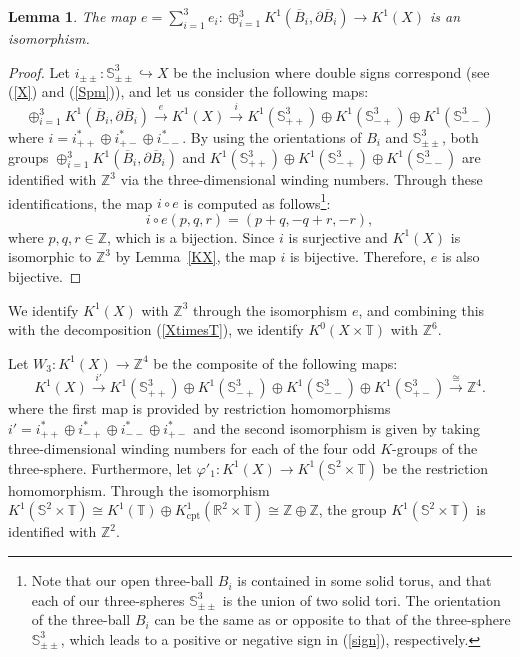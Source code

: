 \documentclass{amsart}
\theoremstyle{plain}
\newtheorem{lemma}[theorem]{Lemma}
\theoremstyle{definition}
\theoremstyle{remark}
\newcommand{\Z}{\mathbb{Z}}
\newcommand{\R}{\mathbb{R}}
\newcommand{\T}{\mathbb{T}}
\newcommand{\SSS}{\mathbb{S}}
\newcommand{\cpt}{\mathrm{cpt}}
\begin{document}
\begin{lemma}
\label{mape}
The map $e = \sum_{i=1}^3 e_i \colon \oplus_{i=1}^3 K^1(\overline{B}_i, \partial \overline{B}_i) \to K^1(X)$ is an isomorphism.
\end{lemma}

\begin{proof}
Let $i_{\pm \pm} \colon \SSS_{\pm\pm}^3 \hookrightarrow X$ be the inclusion where double signs correspond (see (\ref{X}) and (\ref{Spm})), and
let us consider the following maps:
\begin{equation}
\oplus_{i=1}^3 K^1(\overline{B}_i, \partial \overline{B}_i) \overset{e}{\to}
	K^1(X) \overset{i}{\to}
		K^1(\SSS^3_{++}) \oplus K^1(\SSS^3_{-+}) \oplus K^1(\SSS^3_{--})
\end{equation}
where $i = i_{++}^* \oplus i_{+-}^* \oplus i_{--}^*$.
By using the orientations of $B_i$ and $\SSS^3_{\pm \pm}$, both groups $\oplus_{i=1}^3 K^1(\overline{B}_i, \partial \overline{B}_i)$ and $K^1(\SSS^3_{++}) \oplus K^1(\SSS^3_{-+}) \oplus K^1(\SSS^3_{--})$ are identified with $\Z^3$ via the three-dimensional winding numbers.
Through these identifications, the map $i \circ e$ is computed as follows\footnote{Note that our open three-ball $B_i$ is contained in some solid torus, and that each of our three-spheres $\SSS^3_{\pm\pm}$ is the union of two solid tori. The orientation of the three-ball $B_i$ can be the same as or opposite to that of the three-sphere $\SSS^3_{\pm\pm}$, which leads to a positive or negative sign in (\ref{sign}), respectively.}:
\begin{equation}
\label{sign}
	i \circ e (p,q,r) = (p+q, -q+r, -r),
\end{equation}
where $p,q,r \in \Z$, which is a bijection.
Since $i$ is surjective and $K^1(X)$ is isomorphic to $\Z^3$ by Lemma~\ref{KX}, the map $i$ is bijective.
Therefore, $e$ is also bijective.
\end{proof}

We identify $K^1(X)$ with $\Z^3$ through the isomorphism $e$,
and combining this with the decomposition (\ref{XtimesT}), we identify $K^0(X \times \T)$ with $\Z^6$.

Let $W_3 \colon K^1(X) \to \Z^4$ be the composite of the following maps:
\begin{equation*}
	K^1(X) \overset{i'}{\to} K^1(\SSS^3_{++}) \oplus K^1(\SSS^3_{-+}) \oplus K^1(\SSS^3_{--}) \oplus K^1(\SSS^3_{+-}) \overset{\cong}{\longrightarrow} \Z^4.
\end{equation*}
where the first map is provided by restriction homomorphisms $i' = i_{++}^* \oplus i_{-+}^* \oplus i_{--}^* \oplus i_{+-}^*$ and the second isomorphism is given by taking three-dimensional winding numbers for each of the four odd $K$-groups of the three-sphere.
Furthermore, let $\varphi'_1 \colon K^1(X) \to K^1(\SSS^2 \times \T)$ be the restriction homomorphism.
Through the isomorphism
$K^1(\SSS^2 \times \T) \cong K^1(\T) \oplus K^1_\cpt(\R^2 \times \T) \cong \Z \oplus \Z$,
the group $K^1(\SSS^2 \times \T)$ is identified with $\Z^2$.
\end{document}
